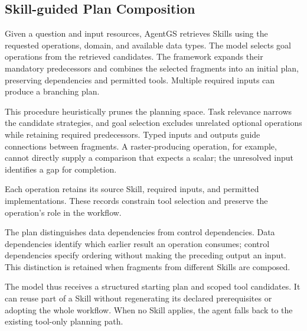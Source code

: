 \subsection{Skill-guided Plan Composition}
\label{sec:composition}
\label{sec:initial-selection}

Given a question and input resources, AgentGS retrieves Skills using the requested operations, domain, and available data types. The model selects goal operations from the retrieved candidates. The framework expands their mandatory predecessors and combines the selected fragments into an initial plan, preserving dependencies and permitted tools. Multiple required inputs can produce a branching plan.

This procedure heuristically prunes the planning space. Task relevance narrows the candidate strategies, and goal selection excludes unrelated optional operations while retaining required predecessors. Typed inputs and outputs guide connections between fragments. A raster-producing operation, for example, cannot directly supply a comparison that expects a scalar; the unresolved input identifies a gap for completion.

Each operation retains its source Skill, required inputs, and permitted implementations. These records constrain tool selection and preserve the operation's role in the workflow.

The plan distinguishes data dependencies from control dependencies. Data dependencies identify which earlier result an operation consumes; control dependencies specify ordering without making the preceding output an input. This distinction is retained when fragments from different Skills are composed.

The model thus receives a structured starting plan and scoped tool candidates. It can reuse part of a Skill without regenerating its declared prerequisites or adopting the whole workflow. When no Skill applies, the agent falls back to the existing tool-only planning path.
